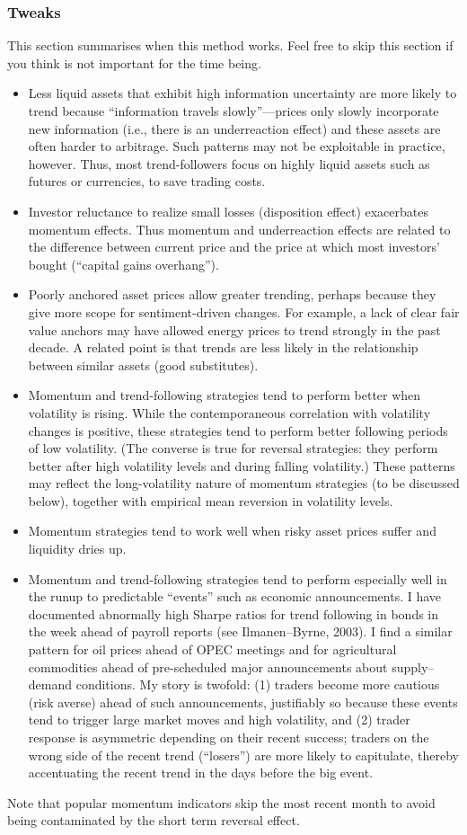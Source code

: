 \documentclass[12 pt]{article}
\begin{document}
\subsubsection{Tweaks}
This section summarises when this method works. Feel free to skip this section if you think is not important for the time being. 
\begin{itemize}
\item Less liquid assets that exhibit high information uncertainty are more likely to trend because “information travels slowly”—prices only
slowly incorporate new information (i.e., there is an underreaction effect) and these assets are often harder to arbitrage. Such patterns may not be exploitable in practice, however. Thus, most trend-followers focus on highly liquid assets such as futures or currencies, to save trading costs.
\item Investor reluctance to realize small losses (disposition effect) exacerbates momentum effects. Thus momentum and underreaction
effects are related to the difference between current price and the price at which most investors’ bought (“capital gains overhang”).
\item Poorly anchored asset prices allow greater trending, perhaps because they give more scope for sentiment-driven changes. For
example, a lack of clear fair value anchors may have allowed energy prices to trend strongly in the past decade. A related point is that trends are less likely in the relationship between similar assets (good substitutes).
\item Momentum and trend-following strategies tend to perform better when volatility is rising. While the contemporaneous correlation with
volatility changes is positive, these strategies tend to perform better following periods of low volatility. (The converse is true for reversal strategies: they perform better after high volatility levels and during falling volatility.) These patterns may reflect the long-volatility nature of momentum strategies (to be discussed below), together with empirical mean reversion in volatility levels.
\item Momentum strategies tend to work well when risky asset prices suffer and liquidity dries up.
\item Momentum and trend-following strategies tend to perform especially well in the runup to predictable “events” such as economic
announcements. I have documented abnormally high Sharpe ratios for trend following in bonds in the week ahead of payroll reports (see
Ilmanen–Byrne, 2003). I find a similar pattern for oil prices ahead of OPEC meetings and for agricultural commodities ahead of pre-scheduled
major announcements about supply–demand conditions. My story is twofold: (1) traders become more cautious (risk averse) ahead of such
announcements, justifiably so because these events tend to trigger large market moves and high volatility, and (2) trader response is
asymmetric depending on their recent success; traders on the wrong side of the recent trend (“losers”) are more likely to capitulate, thereby accentuating the recent trend in the days before the big event.
\end{itemize}
Note that popular momentum indicators skip the most recent month to avoid being contaminated by the short term reversal effect. 
\end{document}
